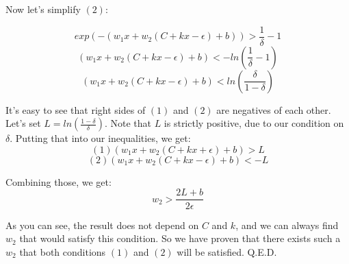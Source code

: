 \documentclass{article}
\begin{document}
Now let's simplify $(2)$:

$$exp(-(w_1x + w_2(C + kx - \epsilon) + b)) > \frac{1}{\delta} - 1$$
$$(w_1x + w_2(C + kx - \epsilon) + b) < -ln(\frac{1}{\delta} - 1)$$
$$(w_1x + w_2(C + kx - \epsilon) + b) < ln(\frac{\delta}{1 - \delta})$$

It's easy to see that right sides of $(1)$ and $(2)$ are negatives of each other.
Let's set $L = ln(\frac{1 - \delta}{\delta})$.  Note that $L$ is strictly positive, due to our condition on  $\delta$.
Putting that into our inequalities, we get:
$$(1) (w_1x + w_2(C + kx + \epsilon) + b) > L$$
$$(2) (w_1x + w_2(C + kx - \epsilon) + b) < -L$$

Combining those, we get:
$$w_2 > \frac{2L + b}{2 \epsilon}$$

As you can see, the result does not depend on $C$ and $k$, and we can always find $w_2$ that would satisfy this condition.
So we have proven that there exists such a $w_2$ that both conditions $(1)$ and $(2)$ will be satisfied.
Q.E.D.
\end{document}
